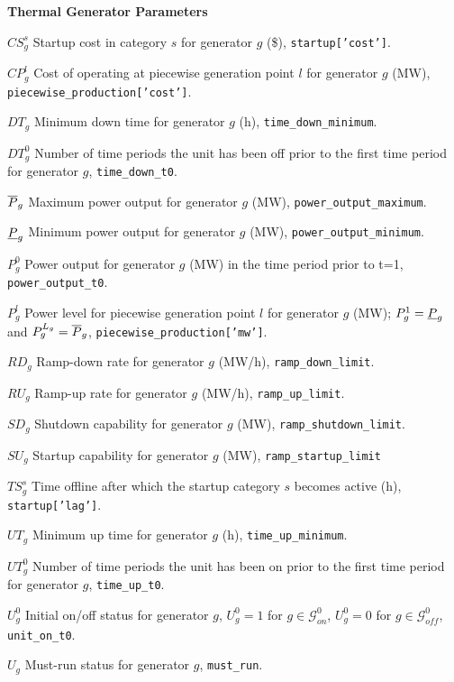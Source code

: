 \documentclass[a4paper,12pt]{article}
\newcommand{\cG}{\mathcal{G}}
\begin{document}
\textbf{Thermal Generator Parameters}
\begin{IEEEdescription}[\mydescriptionopt]
	\item[$CS_g^s$]  Startup cost in category $s$ for generator $g$ (\$), {\tt startup['cost']}.
	\item[$CP_g^l$]  Cost of operating at piecewise generation point $l$ for generator $g$ (MW), {\tt \newline piecewise\_production['cost']}.
	\item[$DT_g$]    Minimum down time for generator $g$ (h), {\tt time\_down\_minimum}.
	\item[$DT^0_g$] Number of time periods the unit has been off prior to the first time period for generator $g$, {\tt time\_down\_t0}.
	\item[$\overline{P}_g$]   Maximum power output for generator $g$ (MW), {\tt power\_output\_maximum}.
	\item[$\underline{P}_g$]   Minimum power output for generator $g$ (MW), {\tt power\_output\_minimum}.
	\item[$P_g^0$]   Power output for generator $g$ (MW) in the time period prior to t=1, {\tt power\_output\_t0}.
	\item[$P_g^l$]   Power level for piecewise generation point $l$ for generator $g$ (MW); $P^1_g = \underline{P}_g$ and $P^{L_g}_g = \overline{P}_g$, {\tt piecewise\_production['mw']}.
	\item[$RD_g$]    Ramp-down rate for generator $g$ (MW/h), {\tt ramp\_down\_limit}.
	\item[$RU_g$]    Ramp-up rate for generator $g$ (MW/h), {\tt ramp\_up\_limit}.
	\item[$SD_g$]    Shutdown capability for generator $g$ (MW), {\tt ramp\_shutdown\_limit}.
	\item[$SU_g$]    Startup capability for generator $g$ (MW), {\tt ramp\_startup\_limit}
	\item[$TS^s_g$] Time offline after which the startup category $s$ becomes active (h), {\tt startup['lag']}.
	\item[$UT_g$]    Minimum up time for generator $g$ (h), {\tt time\_up\_minimum}.
	\item[$UT^0_g$] Number of time periods the unit has been on prior to the first time period for generator $g$, {\tt time\_up\_t0}.
	\item[$U_g^0$]  Initial on/off status for generator $g$, $U_g^0=1$ for $g \in \cG_{\textit{on}}^0$, $U_g^0=0$ for $g \in \cG_{\textit{off}}^0$,  {\tt unit\_on\_t0}.
	\item[$U_g$] 	Must-run status for generator $g$, {\tt must\_run}.
\end{IEEEdescription}
\end{document}

